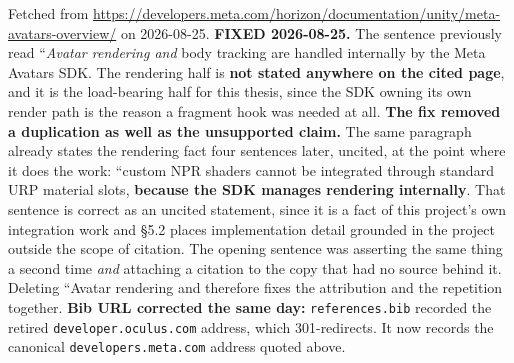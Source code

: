 \documentclass[11pt, a4paper]{article}
\begin{document}
\begin{Form}
  {Fetched from \url{https://developers.meta.com/horizon/documentation/unity/meta-avatars-overview/} on 2026-08-25. \textbf{FIXED 2026-08-25.} The sentence previously read ``\emph{Avatar rendering and} body tracking are handled internally by the Meta Avatars SDK. The rendering half is \textbf{not stated anywhere on the cited page}, and it is the load-bearing half for this thesis, since the SDK owning its own render path is the reason a fragment hook was needed at all. \textbf{The fix removed a duplication as well as the unsupported claim.} The same paragraph already states the rendering fact four sentences later, uncited, at the point where it does the work: ``custom NPR shaders cannot be integrated through standard URP material slots, \textbf{because the SDK manages rendering internally}. That sentence is correct as an uncited statement, since it is a fact of this project's own integration work and \S5.2 places implementation detail grounded in the project outside the scope of citation. The opening sentence was asserting the same thing a second time \emph{and} attaching a citation to the copy that had no source behind it. Deleting ``Avatar rendering and therefore fixes the attribution and the repetition together. \textbf{Bib URL corrected the same day:} \texttt{references.bib} recorded the retired \texttt{developer.oculus.com} address, which 301-redirects. It now records the canonical \texttt{developers.meta.com} address quoted above.}


\end{Form}
\end{document}
